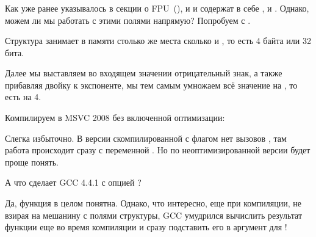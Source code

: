 \subsubsection{\WorkingWithFloatAsWithStructSubSubSectionName}
\label{sec:floatasstruct}

Как уже ранее указывалось в секции о FPU~(), 
и \Tfloat и \Tdouble содержат в себе ,  и . 
Однако, можем ли мы работать с этими полями напрямую? Попробуем с \Tfloat.





Структура  занимает в памяти столько же места сколько и \Tfloat, 
то есть 4 байта или 32 бита.

Далее мы выставляем во входящем значении отрицательный знак, 
а также прибавляя двойку к экспоненте, мы тем 
самым умножаем всё значение на , то есть на 4.

Компилируем в MSVC 2008 без включенной оптимизации:



Слегка избыточно. В версии скомпилированной с флагом \Ox нет вызовов , 
там работа происходит сразу с переменной . Но по неоптимизированной версии будет проще понять.

А что сделает GCC 4.4.1 с опцией \Othree?



Да, функция \ttf в целом понятна. Однако, что интересно, еще при компиляции, 
не взирая на мешанину с полями структуры, GCC умудрился вычислить результат функции  еще
во время компиляции и сразу подставить его в аргумент для \printf{}!

